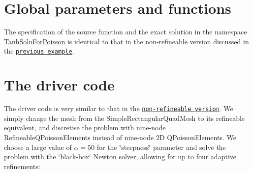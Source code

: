  

\hypertarget{index_global}{}\section{Global parameters and functions}\label{index_global}
The specification of the source function and the exact solution in the namespace {\ttfamily \hyperlink{namespaceTanhSolnForPoisson}{Tanh\+Soln\+For\+Poisson}} is identical to that in the non-\/refineable version discussed in the \href{../../../poisson/two_d_poisson/html/index.html}{\tt previous example}.



 

\hypertarget{index_main}{}\section{The driver code}\label{index_main}
The driver code is very similar to that in the \href{../../../poisson/two_d_poisson/html/index.html}{\tt non-\/refineable version}. We simply change the mesh from the {\ttfamily Simple\+Rectangular\+Quad\+Mesh} to its refineable equivalent, and discretise the problem with nine-\/node {\ttfamily Refineable\+Q\+Poisson\+Elements} instead of nine-\/node 2D {\ttfamily Q\+Poisson\+Elements}. We choose a large value of $ \alpha = 50$ for the \char`\"{}steepness\char`\"{} parameter and solve the problem with the \char`\"{}black-\/box\char`\"{} Newton solver, allowing for up to four adaptive refinements\+:


